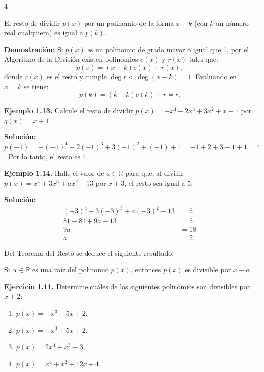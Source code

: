 \documentclass[landscape]{article}
\begin{document}
\begin{landscape}
\begin{multicols}{4}
\begin{tcolorbox}[colback=red!5!white,colframe=red!75!black,title=\textbf{Teorema del resto}]
El resto de dividir $p(x)$ por un polinomio de la forma $x - k$ (con $k$ un número real cualquiera) es igual a $p(k)$.

\medskip\noindent\textbf{Demostración:} Si $p(x)$ es un polinomio de grado mayor o igual que 1, por el Algoritmo de la División existen polinomios $c(x)$ y $r(x)$ tales que:
\begin{equation*}
p(x) = (x - k)c(x) + r(x),
\end{equation*}
donde $r(x)$ es el resto y cumple $\deg r < \deg(x - k) = 1$. Evaluando en $x = k$ se tiene:
\begin{equation*}
p(k) = (k - k)c(k) + r = r.
\end{equation*}
\end{tcolorbox}

\noindent\textbf{Ejemplo 1.13.} Calcule el resto de dividir $p(x) = -x^4 - 2x^3 + 3x^2 + x + 1$ por $q(x) = x + 1$.

\noindent\textbf{Solución:} 
$p(-1) = -(-1)^4 - 2(-1)^3 + 3(-1)^2 + (-1) + 1 = -1 + 2 + 3 - 1 + 1 = 4$.
Por lo tanto, el resto es $4$.

\columnbreak

\noindent\textbf{Ejemplo 1.14.} Halle el valor de $a \in \mathbb{R}$ para que, al dividir $p(x) = x^4 + 3x^3 + ax^2 - 13$ por $x + 3$, el resto sea igual a $5$.

\noindent\textbf{Solución:}
\begin{align*}
(-3)^4 + 3(-3)^3 + a(-3)^2 - 13 &= 5\\
81 - 81 + 9a - 13 &= 5\\
9a &= 18\\
a &= 2.
\end{align*}

Del Teorema del Resto se deduce el siguiente resultado:

\begin{tcolorbox}[colback=red!5!white,colframe=red!75!black,title=\textbf{Teorema}]
Si $\alpha \in \mathbb{R}$ es una raíz del polinomio $p(x)$, entonces $p(x)$ es divisible por $x - \alpha$.
\end{tcolorbox}

\noindent\textbf{Ejercicio 1.11.} Determine cuáles de los siguientes polinomios son divisibles por $x + 2$:

\begin{enumerate}
\item $p(x) = -x^3 - 5x + 2$,
\item $p(x) = -x^3 + 5x + 2$,
\item $p(x) = 2x^4 + x^3 - 3$,
\item $p(x) = x^4 + x^2 + 12x + 4$.
\end{enumerate}


\end{multicols}
\end{landscape}
\end{document}
